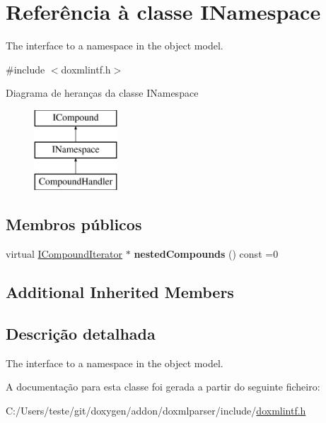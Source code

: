 \hypertarget{class_i_namespace}{\section{Referência à classe I\-Namespace}
\label{class_i_namespace}
}


The interface to a namespace in the object model.  




{\ttfamily \#include $<$doxmlintf.\-h$>$}

Diagrama de heranças da classe I\-Namespace\begin{figure}[H]
\begin{center}
\leavevmode
\includegraphics[height=3.000000cm]{class_i_namespace}
\end{center}
\end{figure}
\subsection*{Membros públicos}
\begin{DoxyCompactItemize}
\item 
\hypertarget{class_i_namespace_a6a1aab20f15a204af0b8d3e8470817bd}{virtual \hyperlink{class_i_compound_iterator}{I\-Compound\-Iterator} $\ast$ {\bfseries nested\-Compounds} () const =0}\label{class_i_namespace_a6a1aab20f15a204af0b8d3e8470817bd}

\end{DoxyCompactItemize}
\subsection*{Additional Inherited Members}


\subsection{Descrição detalhada}
The interface to a namespace in the object model. 

A documentação para esta classe foi gerada a partir do seguinte ficheiro\-:\begin{DoxyCompactItemize}
\item 
C\-:/\-Users/teste/git/doxygen/addon/doxmlparser/include/\hyperlink{include_2doxmlintf_8h}{doxmlintf.\-h}\end{DoxyCompactItemize}
